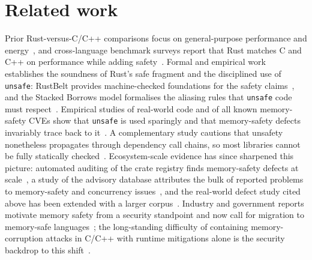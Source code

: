 \documentclass[english,twoside,openright,a4paper,censored,csm,software-track-2020]{HYthesisML}
\begin{document}
\section{Related work}
Prior Rust-versus-C/C++ comparisons focus on general-purpose performance and
energy~\cite{pereira2017energy}, and cross-language benchmark surveys report that Rust matches
C and C++ on performance while adding safety~\cite{bugden2022rust}. Formal and empirical work
establishes the soundness of
Rust's safe fragment and the disciplined use of \texttt{unsafe}: RustBelt provides
machine-checked foundations for the safety claims~\cite{jung2018rustbelt,jung2021safe}, and the
Stacked Borrows model formalises the aliasing rules that \texttt{unsafe} code must
respect~\cite{jung2020stacked}. Empirical studies of real-world code and of all known
memory-safety CVEs show that \texttt{unsafe} is used sparingly and that memory-safety defects
invariably trace back to it~\cite{astrauskas2020unsafe,qin2020rust,xu2021rustcve}. A
complementary study cautions that unsafety nonetheless propagates through dependency call
chains, so most libraries cannot be fully statically checked~\cite{evans2020rust}.
Ecosystem-scale evidence has since sharpened
this picture: automated auditing of the crate registry finds memory-safety defects at
scale~\cite{bae2021rudra}, a study of the advisory database attributes the bulk of reported
problems to memory-safety and concurrency issues~\cite{zheng2024security}, and the real-world
defect study cited above has been extended with a larger corpus~\cite{qin2024safety}. Industry
and government reports motivate memory
safety from a security standpoint and now call for migration to memory-safe
languages~\cite{msrc2019memory,google2022android,cisa2023memorysafe,oncd2024building,google2024securebydesign};
the long-standing difficulty of containing memory-corruption attacks in C/C++ with runtime
mitigations alone is the security backdrop to this shift~\cite{szekeres2013sok}.
\end{document}
